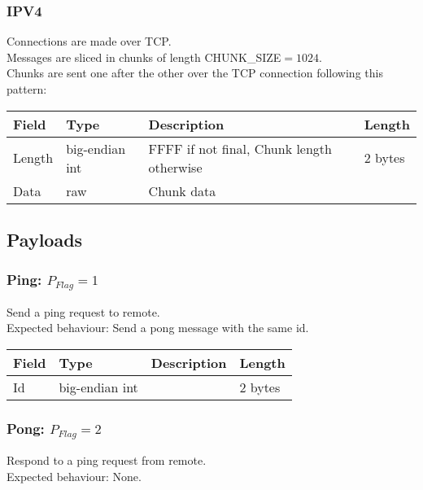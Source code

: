 \documentclass[a4paper,10pt]{article}
\begin{document}
            \subsubsection{IPV4}
                Connections are made over TCP.\\
                Messages are sliced in chunks of length CHUNK\_SIZE$=1024$.\\
                Chunks are sent one after the other over the TCP connection following this pattern:
                
                \noindent\begin{tabularx}{\textwidth}{|l|l|X|l|}
                    \hline Field & Type & Description & Length \\ \hline
                    \hline Length & big-endian int & FFFF if not final, Chunk length otherwise & 2 bytes \\
                    \hline Data & raw & Chunk data & \\
                    \hline
                \end{tabularx}
        \subsection{Payloads}
        
            \subsubsection{Ping: $P_{Flag} = 1$}
                Send a ping request to remote.\\
                Expected behaviour: Send a pong message with the same id.\\
                
                \noindent\begin{tabularx}{\textwidth}{|l|l|X|l|}
                    \hline Field & Type & Description & Length \\ \hline
                    \hline Id & big-endian int & & 2 bytes \\
                    \hline
                \end{tabularx}
            
            \subsubsection{Pong: $P_{Flag} = 2$}
                Respond to a ping request from remote.\\
                Expected behaviour: None.\\
                
\end{document}
